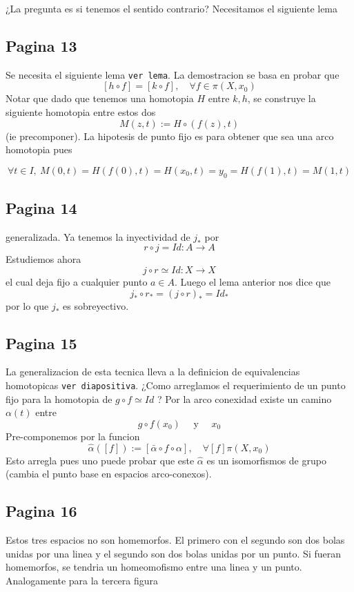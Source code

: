 \documentclass[letterpaper]{article}
\begin{document}
¿La pregunta es si tenemos el sentido contrario? Necesitamos el
siguiente lema

\subsection*{Pagina 13}
Se necesita el siguiente lema \texttt{ver lema}. La demostracion se basa
en probar que
\[ [h \circ f] = [k \circ f ], \quad \forall f \in \pi (X, x_0)\]
Notar que dado que tenemos una homotopia \(H\) entre \(k , h\), se
construye la siguiente homotopia entre estos dos
\[ M(z,t) := H \circ (f(z), t) \]
(ie precomponer). La hipotesis de punto fijo es para obtener que sea una
arco homotopia pues

\[ \forall t \in I ,\ M(0,t) = H \left( f (0), t \right) = H (x_0, t)
    = y_0 = H \left( f(1) , t \right) = M (1, t) \]

\subsection*{Pagina 14}
generalizada. Ya tenemos la inyectividad de \(j_*\) por
\[ r \circ j = Id : A \to A \]
Estudiemos ahora
\[ j \circ r \simeq Id : X \to X\]
el cual deja fijo a cualquier punto \(a \in A\). Luego el lema anterior
nos dice que
\[ j_* \circ r_* = (j \circ r)_* = Id_* \]
por lo que \(j_*\) es sobreyectivo.

\subsection*{Pagina 15}
La generalizacion de esta tecnica lleva a la definicion de equivalencias
homotopicas \texttt{ver diapositiva}. ¿Como arreglamos el requerimiento
de un punto fijo para la homotopia de \(g \circ f \simeq Id\) ? Por la
arco conexidad existe un camino \(\alpha(t)\) entre
\[ g \circ f (x_0) \quad \text{ y } \quad x_0 \]
Pre-componemos por la funcion
\[ \hat \alpha ([f]) := [ \bar \alpha \circ f \circ \alpha ], \quad \forall
  [f] \pi (X, x_0) \]
Esto arregla pues uno puede probar que este \(\hat \alpha\) es un
isomorfismos de grupo (cambia el punto base en espacios arco-conexos).

\subsection*{Pagina 16}
Estos tres espacios no son homemorfos. El primero con el segundo son dos
bolas unidas por una linea y el segundo son dos bolas unidas por un
punto. Si fueran homemorfos, se tendria un homeomofismo entre una linea
y un punto. Analogamente para la tercera figura
\end{document}
